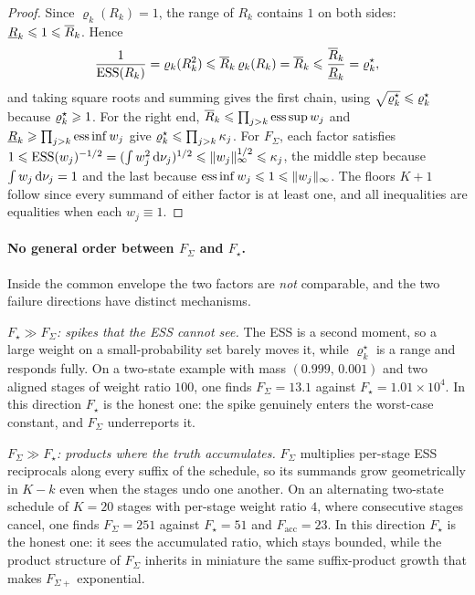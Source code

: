 \documentclass{article}
\begin{document}
{\begin{proof}
Since $\varrho_k(R_k)=1$, the range of $R_k$ contains $1$ on both sides: $\underline R_k\leqslant1\leqslant\overline R_k$. Hence
\begin{equation*}
    \frac{1}{\mathrm{ESS}(R_k)}=\varrho_k(R_k^2)\leqslant\overline R_k\,\varrho_k(R_k)=\overline R_k\leqslant\frac{\overline R_k}{\underline R_k}=\varrho^\star_k ,
\end{equation*}
and taking square roots and summing gives the first chain, using $\sqrt{\varrho^\star_k}\leqslant\varrho^\star_k$ because $\varrho^\star_k\geqslant1$. For the right end, $\overline R_k\leqslant\prod_{j>k}\operatorname{ess\,sup}w_j$ and $\underline R_k\geqslant\prod_{j>k}\operatorname{ess\,inf}w_j$ give $\varrho^\star_k\leqslant\prod_{j>k}\kappa_j$. For $F_\Sigma$, each factor satisfies $1\leqslant\mathrm{ESS}(w_j)^{-1/2}=(\int w_j^2\,\mathrm d\nu_j)^{1/2}\leqslant\lVert w_j\rVert_\infty^{1/2}\leqslant\kappa_j$, the middle step because $\int w_j\,\mathrm d\nu_j=1$ and the last because $\operatorname{ess\,inf}w_j\leqslant1\leqslant\lVert w_j\rVert_\infty$. The floors $K+1$ follow since every summand of either factor is at least one, and all inequalities are equalities when each $w_j\equiv1$.
\end{proof}

\paragraph{No general order between $F_\Sigma$ and $F_\star$.} Inside the common envelope the two factors are \emph{not} comparable, and the two failure directions have distinct mechanisms.

\emph{$F_\star\gg F_\Sigma$: spikes that the ESS cannot see.} The ESS is a second moment, so a large weight on a small-probability set barely moves it, while $\varrho^\star_k$ is a range and responds fully. On a two-state example with mass $(0.999,\,0.001)$ and two aligned stages of weight ratio $100$, one finds $F_\Sigma=13.1$ against $F_\star=1.01\times10^{4}$. In this direction $F_\star$ is the honest one: the spike genuinely enters the worst-case constant, and $F_\Sigma$ underreports it.

\emph{$F_\Sigma\gg F_\star$: products where the truth accumulates.} $F_\Sigma$ multiplies per-stage ESS reciprocals along every suffix of the schedule, so its summands grow geometrically in $K-k$ even when the stages undo one another. On an alternating two-state schedule of $K=20$ stages with per-stage weight ratio $4$, where consecutive stages cancel, one finds $F_\Sigma=251$ against $F_\star=51$ and $F_{\mathrm{acc}}=23$. In this direction $F_\star$ is the honest one: it sees the accumulated ratio, which stays bounded, while the product structure of $F_\Sigma$ inherits in miniature the same suffix-product growth that makes $F_{\Sigma+}$ exponential.

}
\end{document}
